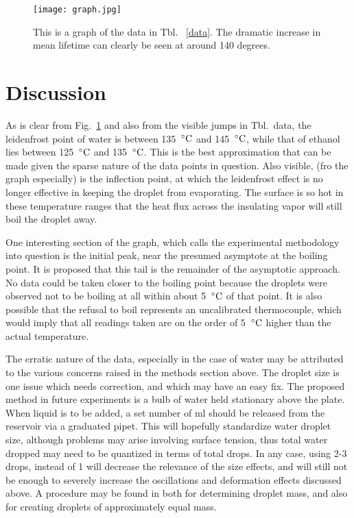 \documentclass[aps,pre,twocolumn,nofootinbib]{revtex4}
\begin{document}
\begin{figure}[h]
\centering
\texttt{[image: graph.jpg]} 
\caption{This is a graph of the data in Tbl. ~\ref{data}.  The dramatic increase in mean lifetime can clearly be seen at around 140 degrees.}
\label{graph}
\end{figure}

\section{Discussion}
As is clear from Fig.~\ref{graph} and also from the visible jumps in Tbl.~{data}, the leidenfrost point of water is between 135 $\,^{\circ}{\rm C}$ and 145 $\,^{\circ}{\rm C}$, while that of ethanol lies between 125 $\,^{\circ}{\rm C}$ and 135 $\,^{\circ}{\rm C}$.  This is the best approximation that can be made given the sparse nature of the data points in question.  Also visible, (fro the graph especially) is the inflection point, at which the leidenfrost effect is no longer effective in keeping the droplet from evaporating.  The surface is so hot in these temperature ranges that the heat flux across the insulating vapor will still boil the droplet away.  

One interesting section of the graph, which calls the experimental methodology into question is the initial peak, near the presumed asymptote at the boiling point.  It is proposed that this tail is the remainder of the asymptotic approach.  No data could be taken closer to the boiling point because the droplets were observed not to be boiling at all within about 5 $\,^{\circ}{\rm C}$ of that point.  It is also possible that the refusal to boil represents an uncalibrated thermocouple, which would imply that all readings taken are on the order of 5 $\,^{\circ}{\rm C}$ higher than the actual temperature.  

The erratic nature of the data, especially in the case of water may be attributed to the various concerns raised in the methods section above.  The droplet size is one issue which needs correction, and which may have an easy fix.  The proposed method in future experiments is a bulb of water held stationary above the plate.  When liquid is to be added, a set number of ml should be released from the reservoir via a graduated pipet.  This will hopefully standardize water droplet size, although problems may arise involving surface tension, thus total water dropped may need to be quantized in terms of total drops.  In any case, using 2-3 drops, instead of 1 will decrease the relevance of the size effects, and will still not be enough to severely increase the oscillations and deformation effects discussed above.  A procedure may be found in \cite{cindy} both for determining droplet mass, and also for creating droplets of approximately equal mass.  
\end{document}
